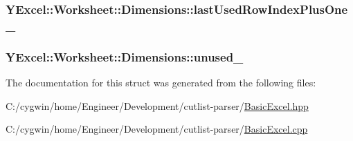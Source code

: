 \subsubsection[{last\+Used\+Row\+Index\+Plus\+One\+\_\+}]{ Y\+Excel\+::\+Worksheet\+::\+Dimensions\+::last\+Used\+Row\+Index\+Plus\+One\+\_\+}\label{struct_y_excel_1_1_worksheet_1_1_dimensions_aa323b31175d7cfd70a0d07ee9d32364f}
\hypertarget{struct_y_excel_1_1_worksheet_1_1_dimensions_a56e64deaa5fe8cab9c398255e1e05b3f}{}
\subsubsection[{unused\+\_\+}]{ Y\+Excel\+::\+Worksheet\+::\+Dimensions\+::unused\+\_\+}\label{struct_y_excel_1_1_worksheet_1_1_dimensions_a56e64deaa5fe8cab9c398255e1e05b3f}


The documentation for this struct was generated from the following files\+:\begin{DoxyCompactItemize}
\item 
C\+:/cygwin/home/\+Engineer/\+Development/cutlist-\/parser/\hyperlink{_basic_excel_8hpp}{Basic\+Excel.\+hpp}\item 
C\+:/cygwin/home/\+Engineer/\+Development/cutlist-\/parser/\hyperlink{_basic_excel_8cpp}{Basic\+Excel.\+cpp}\end{DoxyCompactItemize}

